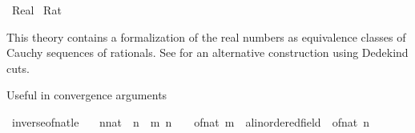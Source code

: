 %
\begin{isabellebody}%
%
%
\isadelimdocument
%
\endisadelimdocument
%
\isatagdocument
%
\isamarkuptrue%
%
\endisatagdocument
{\isafolddocument}%
%
\isadelimdocument
%
\endisadelimdocument
%
\isadelimtheory
%
\endisadelimtheory
%
\isatagtheory
{}\isamarkupfalse%
\ Real\isanewline
{}\ Rat\isanewline
{}%
\endisatagtheory
{\isafoldtheory}%
%
\isadelimtheory
%
\endisadelimtheory
%
\begin{isamarkuptext}%
This theory contains a formalization of the real numbers as equivalence
  classes of Cauchy sequences of rationals. See
   for an alternative construction using
  Dedekind cuts.%
\end{isamarkuptext}\isamarkuptrue%
%
\isadelimdocument
%
\endisadelimdocument
%
\isatagdocument
%
\isamarkuptrue%
%
\endisatagdocument
{\isafolddocument}%
%
\isadelimdocument
%
\endisadelimdocument
%
\begin{isamarkuptext}%
Useful in convergence arguments%
\end{isamarkuptext}\isamarkuptrue%
\isamarkupfalse%
\ inverse{\isacharunderscore}{\kern0pt}of{\isacharunderscore}{\kern0pt}nat{\isacharunderscore}{\kern0pt}le{\isacharcolon}{\kern0pt}\isanewline
\ \ \ n{\isacharcolon}{\kern0pt}{\isacharcolon}{\kern0pt}nat\ \ {\isachardoublequoteopen}{\isasymlbrakk}n\ {\isasymle}\ m{\isacharsemicolon}{\kern0pt}\ n{\isasymnoteq}{}{\isasymrbrakk}\ {\isasymLongrightarrow}\ {}\ {\isacharslash}{\kern0pt}\ of{\isacharunderscore}{\kern0pt}nat\ m\ {\isasymle}\ {\isacharparenleft}{\kern0pt}{}{\isacharcolon}{\kern0pt}{\isacharcolon}{\kern0pt}{\isacharprime}{\kern0pt}a{\isacharcolon}{\kern0pt}{\isacharcolon}{\kern0pt}linordered{\isacharunderscore}{\kern0pt}field{\isacharparenright}{\kern0pt}\ {\isacharslash}{\kern0pt}\ of{\isacharunderscore}{\kern0pt}nat\ n{\isachardoublequoteclose}\isanewline
%

\end{isabellebody}
